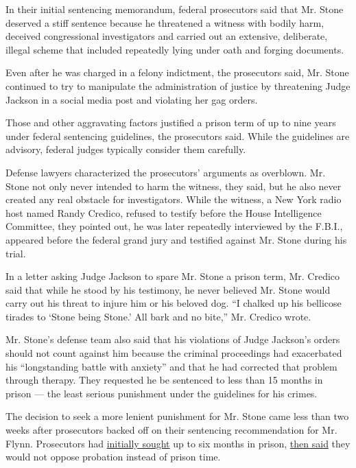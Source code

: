 In their initial sentencing memorandum, federal prosecutors said that
Mr. Stone deserved a stiff sentence because he threatened a witness with
bodily harm, deceived congressional investigators and carried out an
extensive, deliberate, illegal scheme that included repeatedly lying
under oath and forging documents.

Even after he was charged in a felony indictment, the prosecutors said,
Mr. Stone continued to try to manipulate the administration of justice
by threatening Judge Jackson in a social media post and violating her
gag orders.

Those and other aggravating factors justified a prison term of up to
nine years under federal sentencing guidelines, the prosecutors said.
While the guidelines are advisory, federal judges typically consider
them carefully.

Defense lawyers characterized the prosecutors' arguments as overblown.
Mr. Stone not only never intended to harm the witness, they said, but he
also never created any real obstacle for investigators. While the
witness, a New York radio host named Randy Credico, refused to testify
before the House Intelligence Committee, they pointed out, he was later
repeatedly interviewed by the F.B.I., appeared before the federal grand
jury and testified against Mr. Stone during his trial.

In a letter asking Judge Jackson to spare Mr. Stone a prison term, Mr.
Credico said that while he stood by his testimony, he never believed Mr.
Stone would carry out his threat to injure him or his beloved dog. ``I
chalked up his bellicose tirades to `Stone being Stone.' All bark and no
bite,'' Mr. Credico wrote.

Mr. Stone's defense team also said that his violations of Judge
Jackson's orders should not count against him because the criminal
proceedings had exacerbated his ``longstanding battle with anxiety'' and
that he had corrected that problem through therapy. They requested he be
sentenced to less than 15 months in prison --- the least serious
punishment under the guidelines for his crimes.

The decision to seek a more lenient punishment for Mr. Stone came less
than two weeks after prosecutors backed off on their sentencing
recommendation for Mr. Flynn. Prosecutors had
\href{https://www.nytimes.com/2020/01/07/us/politics/flynn-prosecutors-sentencing.html}{initially
sought} up to six months in prison,
\href{https://www.washingtonpost.com/local/legal-issues/prosecutors-appear-to-back-away-from-prison-recommendation-for-michael-flynn/2020/01/29/f861f3e0-42c5-11ea-b5fc-eefa848cde99_story.html}{then
said} they would not oppose probation instead of prison time.

